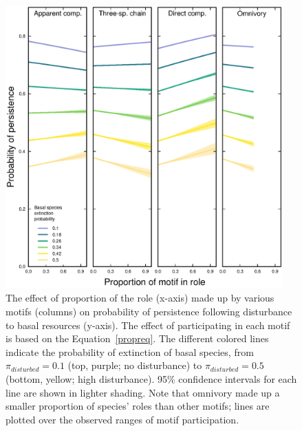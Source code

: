 \documentclass[12pt]{article}
\begin{document}
\begin{spacing}{2.0}
        \begin{figure}[hb!]
        \centering
        \includegraphics[width=0.95\textwidth]{figures/persistence_motif_participation.eps}
        \caption{The effect of proportion of the role (x-axis) made up by various motifs (columns) on probability of persistence following disturbance to basal resources (y-axis). The effect of participating in each motif is based on the Equation~\ref{propreq}. The different colored lines indicate the probability of extinction of basal species, from $\pi_{disturbed} = 0.1$ (top, purple; no disturbance) to $\pi_{disturbed} = 0.5$ (bottom, yellow; high disturbance). 95\% confidence intervals for each line are shown in lighter shading. Note that omnivory made up a smaller proportion of species' roles than other motifs; lines are plotted over the observed ranges of motif participation.}
    \label{fig:prop_lmer_all}
    \end{figure}
        

\end{spacing}
\end{document}
